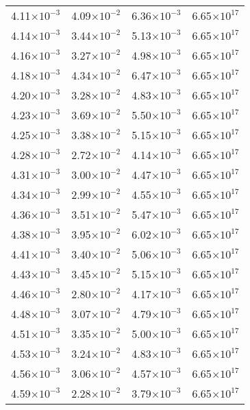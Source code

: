 \documentclass{aa}
\begin{document}
{\begin{longtable}{c|c|c|c}
4.11$\times 10^{-3}$ & 4.09$\times 10^{-2}$ & 6.36$\times 10^{-3}$ & 6.65$\times 10^{17}$  \\
4.14$\times 10^{-3}$ & 3.44$\times 10^{-2}$ & 5.13$\times 10^{-3}$ & 6.65$\times 10^{17}$  \\
4.16$\times 10^{-3}$ & 3.27$\times 10^{-2}$ & 4.98$\times 10^{-3}$ & 6.65$\times 10^{17}$  \\
4.18$\times 10^{-3}$ & 4.34$\times 10^{-2}$ & 6.47$\times 10^{-3}$ & 6.65$\times 10^{17}$  \\
4.20$\times 10^{-3}$ & 3.28$\times 10^{-2}$ & 4.83$\times 10^{-3}$ & 6.65$\times 10^{17}$  \\
4.23$\times 10^{-3}$ & 3.69$\times 10^{-2}$ & 5.50$\times 10^{-3}$ & 6.65$\times 10^{17}$  \\
4.25$\times 10^{-3}$ & 3.38$\times 10^{-2}$ & 5.15$\times 10^{-3}$ & 6.65$\times 10^{17}$  \\
4.28$\times 10^{-3}$ & 2.72$\times 10^{-2}$ & 4.14$\times 10^{-3}$ & 6.65$\times 10^{17}$  \\
4.31$\times 10^{-3}$ & 3.00$\times 10^{-2}$ & 4.47$\times 10^{-3}$ & 6.65$\times 10^{17}$  \\
4.34$\times 10^{-3}$ & 2.99$\times 10^{-2}$ & 4.55$\times 10^{-3}$ & 6.65$\times 10^{17}$  \\
4.36$\times 10^{-3}$ & 3.51$\times 10^{-2}$ & 5.47$\times 10^{-3}$ & 6.65$\times 10^{17}$  \\
4.38$\times 10^{-3}$ & 3.95$\times 10^{-2}$ & 6.02$\times 10^{-3}$ & 6.65$\times 10^{17}$  \\
4.41$\times 10^{-3}$ & 3.40$\times 10^{-2}$ & 5.06$\times 10^{-3}$ & 6.65$\times 10^{17}$  \\
4.43$\times 10^{-3}$ & 3.45$\times 10^{-2}$ & 5.15$\times 10^{-3}$ & 6.65$\times 10^{17}$  \\
4.46$\times 10^{-3}$ & 2.80$\times 10^{-2}$ & 4.17$\times 10^{-3}$ & 6.65$\times 10^{17}$  \\
4.48$\times 10^{-3}$ & 3.07$\times 10^{-2}$ & 4.79$\times 10^{-3}$ & 6.65$\times 10^{17}$  \\
4.51$\times 10^{-3}$ & 3.35$\times 10^{-2}$ & 5.00$\times 10^{-3}$ & 6.65$\times 10^{17}$  \\
4.53$\times 10^{-3}$ & 3.24$\times 10^{-2}$ & 4.83$\times 10^{-3}$ & 6.65$\times 10^{17}$  \\
4.56$\times 10^{-3}$ & 3.06$\times 10^{-2}$ & 4.57$\times 10^{-3}$ & 6.65$\times 10^{17}$  \\
4.59$\times 10^{-3}$ & 2.28$\times 10^{-2}$ & 3.79$\times 10^{-3}$ & 6.65$\times 10^{17}$  \\

\end{longtable}}
\end{document}
